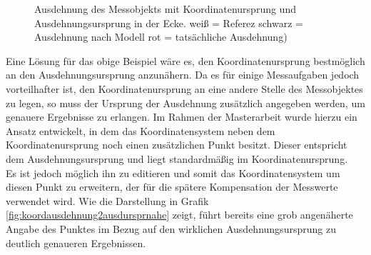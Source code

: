 \begin{figure}[H]
	\label{fig:objektausdehnung}
	\centering
	\caption[Ausdehnung des Messobjekts mit Ursprung in der Ecke]{Ausdehnung des Messobjekts mit Koordinatenursprung und Ausdehnungsursprung in der Ecke. weiß = Referez schwarz = Ausdehnung nach Modell rot = tatsächliche Ausdehnung) \protect\footnotemark}
\end{figure}

Eine Lösung für das obige Beispiel wäre es, den Koordinatenursprung bestmöglich an den Ausdehnungsursprung anzunähern. Da es für einige Messaufgaben jedoch vorteilhafter ist, den Koordinatenursprung an eine andere Stelle des Messobjektes zu legen, so muss der Ursprung der Ausdehnung zusätzlich angegeben werden, um genauere Ergebnisse zu erlangen. Im Rahmen der Masterarbeit wurde hierzu ein Ansatz entwickelt, in dem das Koordinatensystem neben dem Koordinatenursprung noch einen zusätzlichen Punkt besitzt. Dieser entspricht dem Ausdehnungsursprung und liegt standardmäßig im Koordinatenursprung. \\
Es ist jedoch möglich ihn zu editieren und somit das Koordinatensystem um diesen Punkt zu erweitern, der für die spätere Kompensation der Messwerte verwendet wird. Wie die Darstellung in Grafik \ref{fig:koordausdehnung2ausdursprnahe} zeigt, führt bereits eine grob angenäherte Angabe des Punktes im Bezug auf den wirklichen Ausdehnungsursprung zu deutlich genaueren Ergebnissen.

